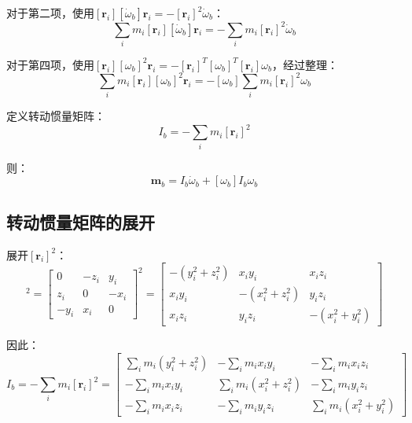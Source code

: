 \documentclass[12pt,a4paper]{article}
\begin{document}
对于第二项，使用$[\bm{r}_i][\dot{\omega}_b]\bm{r}_i = -[\bm{r}_i]^2 \dot{\omega}_b$：
\begin{equation}
\sum_i m_i [\bm{r}_i][\dot{\omega}_b]\bm{r}_i = -\sum_i m_i [\bm{r}_i]^2 \dot{\omega}_b
\end{equation}

对于第四项，使用$[\bm{r}_i][\omega_b]^2 \bm{r}_i = -[\bm{r}_i]^T [\omega_b]^T [\bm{r}_i] \omega_b$，经过整理：
\begin{equation}
\sum_i m_i [\bm{r}_i][\omega_b]^2 \bm{r}_i = -[\omega_b] \sum_i m_i [\bm{r}_i]^2 \omega_b
\end{equation}

定义转动惯量矩阵：
\begin{equation}
I_b = -\sum_i m_i [\bm{r}_i]^2
\label{eq:inertia_definition}
\end{equation}

则：
\begin{equation}
\bm{m}_b = I_b \dot{\omega}_b + [\omega_b] I_b \omega_b
\label{eq:rotational_dynamics}
\end{equation}

\subsection{转动惯量矩阵的展开}

展开$[\bm{r}_i]^2$：
\begin{equation}
[\bm{r}_i]^2 = \begin{bmatrix}
0 & -z_i & y_i \\
z_i & 0 & -x_i \\
-y_i & x_i & 0
\end{bmatrix}^2 = \begin{bmatrix}
-(y_i^2 + z_i^2) & x_i y_i & x_i z_i \\
x_i y_i & -(x_i^2 + z_i^2) & y_i z_i \\
x_i z_i & y_i z_i & -(x_i^2 + y_i^2)
\end{bmatrix}
\end{equation}

因此：
\begin{equation}
I_b = -\sum_i m_i [\bm{r}_i]^2 = \begin{bmatrix}
\sum_i m_i(y_i^2 + z_i^2) & -\sum_i m_i x_i y_i & -\sum_i m_i x_i z_i \\
-\sum_i m_i x_i y_i & \sum_i m_i(x_i^2 + z_i^2) & -\sum_i m_i y_i z_i \\
-\sum_i m_i x_i z_i & -\sum_i m_i y_i z_i & \sum_i m_i(x_i^2 + y_i^2)
\end{bmatrix}
\end{equation}
\end{document}
